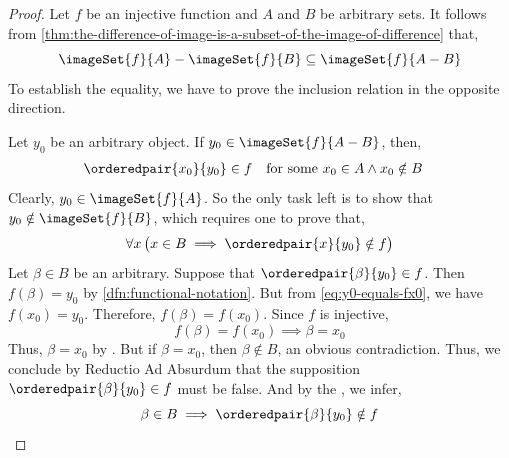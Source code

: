 \begin{proof}
    Let \( f \) be an injective function and \( A \) and \( B \) be arbitrary sets.
    It follows from \cref{thm:the-difference-of-image-is-a-subset-of-the-image-of-difference} that,
    \begin{equation*}
        \imageSet{f}{A} - \imageSet{f}{B} \subseteq \imageSet{f}{A - B}
    \end{equation*}
    To establish the equality, we have to prove the inclusion relation in the opposite direction.

    \vspace{0.5cm}
    \noindent
    Let \( y_{0} \) be an arbitrary object. If \( y_{0} \in \imageSet{f}{A-B} \), then,
    \begin{equation}
        \label{eq:y0-equals-fx0}
        \begin{aligned}
            \orderedpair{x_{0}}{y_{0}} \in f&
        \end{aligned}
        \begin{aligned}
            &\text{for some \( x_{0} \in A \land x_{0} \notin B \)}
        \end{aligned}
    \end{equation}
    Clearly, \( y_{0} \in \imageSet{f}{A} \). So the only task left is to show that
    \( y_{0} \notin \imageSet{f}{B} \), which requires one to prove that,
    \begin{equation}
        \label{eq:y0-does-not-belong-to-image-of-f-under-B}
        \forall x \, \big( x \in B \implies \orderedpair{x}{y_{0}} \notin f \big)
    \end{equation}
    Let \( \beta \in B \) be an arbitrary. Suppose that \( \orderedpair{\beta}{y_{0}} \in f \).
    Then \( f(\beta) = y_{0} \) by \cref{dfn:functional-notation}. But from \eqref{eq:y0-equals-fx0},
    we have \( f(x_{0}) = y_{0} \). Therefore, \( f(\beta) = f(x_{0}) \). Since \( f \) is injective,
    \begin{equation*}
        f(\beta) = f(x_{0}) \implies \beta = x_{0}
    \end{equation*}
    Thus, \( \beta = x_{0} \) by . But if \( \beta = x_{0} \), then \( \beta \notin B \),
    an obvious contradiction.
    Thus, we conclude by Reductio Ad Absurdum that the supposition \( \orderedpair{\beta}{y_{0}} \in f \)
    must be false. And by the , we infer,
    \begin{equation*}
        \beta \in B \implies \orderedpair{\beta}{y_{0}} \notin f

\end{equation*}
\end{proof}
